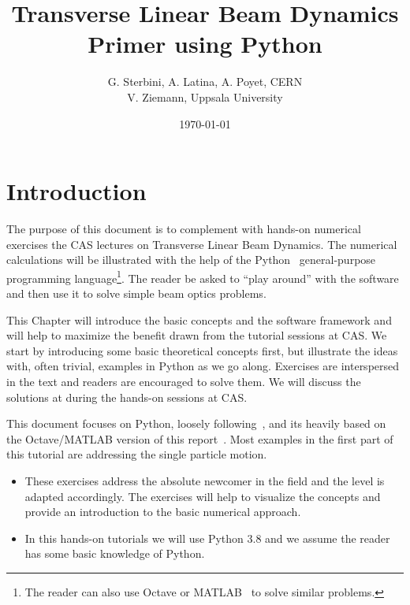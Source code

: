 \documentclass{article}
\newenvironment{block}[1]{\tcolorbox[beamer,%
    noparskip,breakable,
    colback=backcolour,colframe=blue,%
    colbacklower=backcolour!75!backcolour,%
    title=#1]
    }%
    {\endtcolorbox}
\begin{document}
\title{Transverse Linear Beam Dynamics\\ Primer using Python}
\author{ G. Sterbini, A. Latina, A. Poyet, CERN \\
V. Ziemann, Uppsala University}
\date{\today}
\maketitle
%
%

\section{Introduction}
%
The purpose of this document is to complement with hands-on numerical exercises the CAS lectures on Transverse Linear Beam Dynamics. 
The numerical calculations will be illustrated with the help of the Python~\cite{PYTHON} general-purpose programming language\footnote{The reader can also use Octave \cite{OCTAVE} or MATLAB~\cite{MATLAB} to solve similar problems.}. The 
reader be asked to ``play around'' with the software and then
use it to solve simple beam optics problems.

This Chapter will introduce the
basic concepts and the software framework and will help to maximize the benefit drawn from the tutorial 
sessions at CAS. We start by introducing some basic theoretical concepts first, but illustrate the
ideas with, often trivial, examples in Python as we go along. Exercises are 
interspersed in the text and readers are 
encouraged to solve them. We will discuss the solutions at during the hands-on sessions at CAS. 
\par
This document focuses on Python, loosely following~\cite{VZAPB}, and its heavily based on the Octave/MATLAB version of this report~\cite{TUTOCT}. Most examples in the first part
of this tutorial are addressing the single particle motion.
\vspace{3mm}
\begin{block}{Disclaimer}
\begin{itemize}
    \item These exercises address the absolute newcomer in the field and the level is adapted accordingly. The exercises will help to visualize the concepts and provide an introduction to the basic numerical approach.
    \item In this hands-on tutorials we will use Python 3.8 and we assume the reader has some basic knowledge of Python.
\end{itemize}
\end{block}
\end{document}
